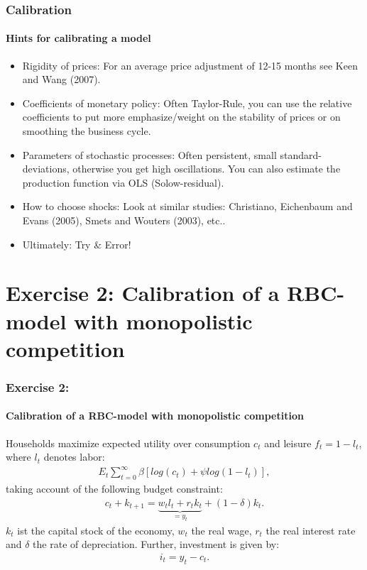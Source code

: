 \documentclass{beamer} %
\begin{document}
\begin{frame}\frametitle{Calibration}\framesubtitle{Hints for calibrating a model}
\begin{itemize}
   \item Rigidity of prices: For an average price adjustment of 12-15
       months see Keen and Wang (2007).
   \item Coefficients of monetary policy: Often Taylor-Rule, you can use
       the relative coefficients to put more emphasize/weight on the
       stability of prices or on smoothing the business cycle.
   \item Parameters of stochastic processes: Often persistent, small
       standard-deviations, otherwise you get high oscillations. You can
       also estimate the production function via OLS (Solow-residual).
   \item How to choose shocks: Look at similar studies: Christiano,
       Eichenbaum and Evans (2005), Smets and Wouters (2003), etc..
   \item Ultimately: Try \& Error!
\end{itemize}
\end{frame}

\section{Exercise 2: Calibration of a RBC-model with monopolistic competition}
\begin{frame}\frametitle{Exercise 2:}\framesubtitle{Calibration of a RBC-model with monopolistic competition}
Households maximize expected utility over consumption $c_t$ and leisure
$f_t=1-l_t$, where $l_t$ denotes labor:
\begin{align*}
  E_t \sum_{t=0}^\infty \beta [log(c_t) + \psi log(1-l_t)],
\end{align*}
taking account of the following budget constraint:
\begin{align*}
  c_t + k_{t+1} = \underbrace{w_t l_t + r_t k_t}_{=y_t} + (1-\delta)k_t.
\end{align*}
$k_t$ ist the capital stock of the economy, $w_t$ the real wage, $r_t$ the
real interest rate and $\delta$ the rate of depreciation. Further, investment
is given by:
\begin{align*}i_t=y_t-c_t. \end{align*}
\end{frame}
\end{document}
